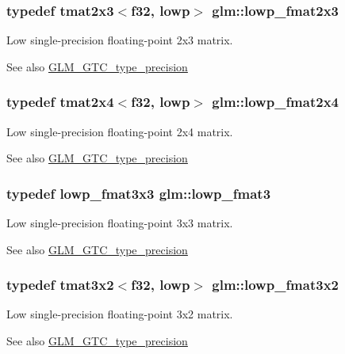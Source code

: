 \subsubsection[{lowp\+\_\+fmat2x3}]{\setlength{\rightskip}{0pt plus 5cm}typedef tmat2x3$<${\bf f32}, lowp$>$ {\bf glm\+::lowp\+\_\+fmat2x3}}\label{namespaceglm_a96419cd63d22eebac48b2529c5954538}
Low single-\/precision floating-\/point 2x3 matrix. \begin{DoxySeeAlso}{See also}
\hyperlink{group__gtc__type__precision}{G\+L\+M\+\_\+\+G\+T\+C\+\_\+type\+\_\+precision} 
\end{DoxySeeAlso}
\hypertarget{namespaceglm_aa5b4e4ba427f641d864880d821560810}{}
\subsubsection[{lowp\+\_\+fmat2x4}]{\setlength{\rightskip}{0pt plus 5cm}typedef tmat2x4$<${\bf f32}, lowp$>$ {\bf glm\+::lowp\+\_\+fmat2x4}}\label{namespaceglm_aa5b4e4ba427f641d864880d821560810}
Low single-\/precision floating-\/point 2x4 matrix. \begin{DoxySeeAlso}{See also}
\hyperlink{group__gtc__type__precision}{G\+L\+M\+\_\+\+G\+T\+C\+\_\+type\+\_\+precision} 
\end{DoxySeeAlso}
\hypertarget{namespaceglm_a88ae00cab6aae48d56700915c7799973}{}
\subsubsection[{lowp\+\_\+fmat3}]{\setlength{\rightskip}{0pt plus 5cm}typedef {\bf lowp\+\_\+fmat3x3} {\bf glm\+::lowp\+\_\+fmat3}}\label{namespaceglm_a88ae00cab6aae48d56700915c7799973}
Low single-\/precision floating-\/point 3x3 matrix. \begin{DoxySeeAlso}{See also}
\hyperlink{group__gtc__type__precision}{G\+L\+M\+\_\+\+G\+T\+C\+\_\+type\+\_\+precision} 
\end{DoxySeeAlso}
\hypertarget{namespaceglm_a6649f0975e5e98ab9c1c289e0430e43d}{}
\subsubsection[{lowp\+\_\+fmat3x2}]{\setlength{\rightskip}{0pt plus 5cm}typedef tmat3x2$<${\bf f32}, lowp$>$ {\bf glm\+::lowp\+\_\+fmat3x2}}\label{namespaceglm_a6649f0975e5e98ab9c1c289e0430e43d}
Low single-\/precision floating-\/point 3x2 matrix. \begin{DoxySeeAlso}{See also}
\hyperlink{group__gtc__type__precision}{G\+L\+M\+\_\+\+G\+T\+C\+\_\+type\+\_\+precision} 
\end{DoxySeeAlso}
\hypertarget{namespaceglm_a768d23520c7658624b9f212324ae8db0}{}
